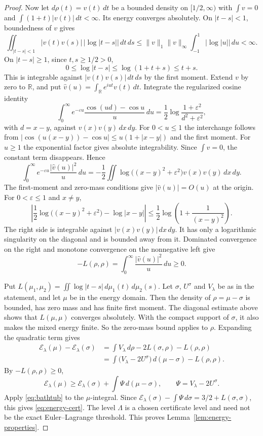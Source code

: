 \begin{proof}
Now let \(d\rho(t)=v(t)\,dt\) be a bounded density on \([1/2,\infty)\) with \(\int v=0\) and \(\int(1+t)|v(t)|\,dt<\infty\). Its energy converges absolutely. On \(|t-s|<1\), boundedness of \(v\) gives
\[
 \iint_{|t-s|<1}|v(t)v(s)|\,|\log|t-s||\,dt\,ds
 \le \|v\|_1\|v\|_\infty
       \int_{-1}^{1}|\log|u||\,du<\infty.
\]
On \(|t-s|\ge1\), since \(t,s\ge1/2>0\),
\[
 0\le\log|t-s|\le\log(1+t+s)\le t+s.
\]
This is integrable against \(|v(t)v(s)|\,dt\,ds\) by the first moment. Extend \(v\) by zero to \(\mathbb R\), and put \(\widehat v(u)=\int_{\mathbb R}e^{iut}v(t)\,dt\). Integrate the regularized cosine identity
\[
 \int_0^\infty e^{-\varepsilon u}
 \frac{\cos(u d)-\cos u}{u}\,du
 =\frac12\log\frac{1+\varepsilon^2}{d^2+\varepsilon^2},
\]
with \(d=x-y\), against \(v(x)v(y)\,dx\,dy\). For \(0<u\le1\) the interchange follows from \(|\cos(u(x-y))-\cos u|\le u(1+|x-y|)\) and the first moment. For \(u\ge1\) the exponential factor gives absolute integrability. Since \(\int v=0\), the constant term disappears. Hence
\[
 \int_0^\infty e^{-\varepsilon u}\frac{|\widehat v(u)|^2}{u}\,du
 =-\frac12\iint\log\!\bigl((x-y)^2+\varepsilon^2\bigr)v(x)v(y)\,dx\,dy.
\]
The first-moment and zero-mass conditions give \(|\widehat v(u)|=O(u)\) at the origin. For \(0<\varepsilon\le1\) and \(x\ne y\),
\[
\left|\frac12\log\bigl((x-y)^2+\varepsilon^2\bigr)
      -\log|x-y|\right|
\le\frac12\log\left(1+\frac1{(x-y)^2}\right).
\]
The right side is integrable against \(|v(x)v(y)|\,dx\,dy\). It has only a logarithmic singularity on the diagonal and is bounded away from it. Dominated convergence on the right and monotone convergence on the nonnegative left give
\[
 -L(\rho,\rho)=
 \int_0^\infty\frac{|\widehat v(u)|^2}{u}\,du\ge0.
\]

Put \(L(\mu_1,\mu_2)=\iint\log|t-s|\,d\mu_1(t)\,d\mu_2(s)\). Let \(\sigma\), \(U^\sigma\) and \(V_\lambda\) be as in the statement, and let \(\mu\) be in the energy domain. Then the density of \(\rho=\mu-\sigma\) is bounded, has zero mass and has finite first moment. The diagonal estimate above shows that \(L(\mu,\mu)\) converges absolutely. With the compact support of \(\sigma\), it also makes the mixed energy finite. So the zero-mass bound applies to \(\rho\). Expanding the quadratic term gives
\[
 \begin{aligned}
 \mathcal E_\lambda(\mu)-\mathcal E_\lambda(\sigma)
 &=\int V_\lambda\,d\rho-2L(\sigma,\rho)-L(\rho,\rho)\\
 &=\int\bigl(V_\lambda-2U^\sigma\bigr)\,d(\mu-\sigma)-L(\rho,\rho).
 \end{aligned}
\]
By \(-L(\rho,\rho)\ge0\),
\begin{equation}\label{eq:energy-dual}
 \mathcal E_\lambda(\mu)\ge \mathcal E_\lambda(\sigma)+\int \Psi\,d(\mu-\sigma),\qquad
 \Psi=V_\lambda-2U^\sigma.
\end{equation}
Apply \eqref{eq:bathtub} to the \(\mu\)-integral. Since \(\mathcal E_\lambda(\sigma)-\int \Psi\,d\sigma=3/2+L(\sigma,\sigma)\), this gives \eqref{eq:energy-cert}. The level \(\Lambda\) is a chosen certificate level and need not be the exact Euler--Lagrange threshold. This proves Lemma~\ref{lem:energy-properties}.
\end{proof}

